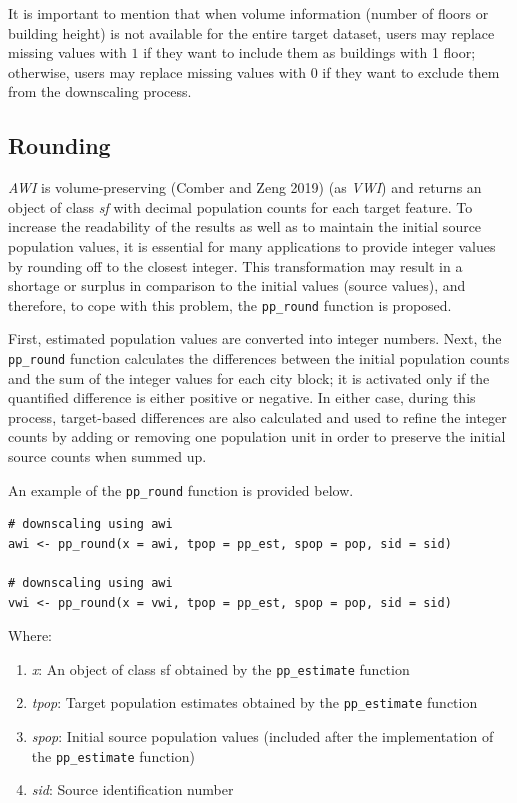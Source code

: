It is important to mention that when volume information (number of floors or building height)
is not available for the entire target dataset, users may replace missing values with \(1\) if they want to
include them as buildings with 1 floor; otherwise, users may replace missing values with \(0\) if they
want to exclude them from the downscaling process.

\hypertarget{rounding}{%
\subsection{Rounding}\label{rounding}}

\emph{AWI} is volume-preserving (Comber and Zeng 2019) (as \emph{VWI}) and returns an object of class \emph{sf} with
decimal population counts for each target feature. To increase the readability of the results as well
as to maintain the initial source population values, it is essential for many applications to provide
integer values by rounding off to the closest integer. This transformation may result in a shortage or
surplus in comparison to the initial values (source values), and therefore, to cope with this problem,
the \texttt{pp\_round} function is proposed.

First, estimated population values are converted into integer numbers. Next, the \texttt{pp\_round} function calculates the differences between the initial population counts and the sum of the integer values for each city block; it is activated only if the quantified difference is either positive or negative. In either case, during this process, target-based differences are also calculated and used to refine the integer counts by adding or removing one population unit in order to preserve the initial source counts when summed up.

An example of the \texttt{pp\_round} function is provided below.

\begin{verbatim}
# downscaling using awi
awi <- pp_round(x = awi, tpop = pp_est, spop = pop, sid = sid)

# downscaling using awi
vwi <- pp_round(x = vwi, tpop = pp_est, spop = pop, sid = sid)
\end{verbatim}

Where:

\begin{enumerate}
\def\labelenumi{\arabic{enumi}.}
\tightlist
\item
  \emph{x}: An object of class sf obtained by the \texttt{pp\_estimate} function
\item
  \emph{tpop}: Target population estimates obtained by the \texttt{pp\_estimate} function
\item
  \emph{spop}: Initial source population values (included after the implementation of the \texttt{pp\_estimate}
  function)
\item
  \emph{sid}: Source identification number
\end{enumerate}

